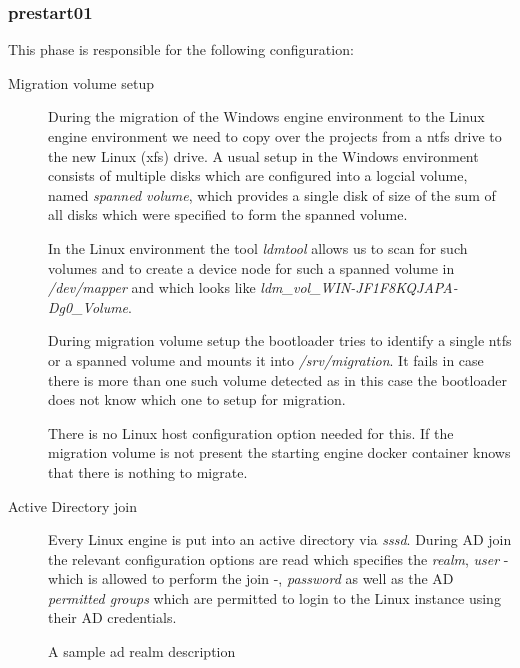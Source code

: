 			\subsubsection{prestart01}
			This phase is responsible for the following configuration:
			\begin{description}
				\item[Migration volume setup] During the migration of the Windows engine environment to the Linux engine environment we need to copy over the projects from a ntfs drive to the new Linux (xfs) drive. A usual setup in the Windows environment consists of multiple disks which are configured into a logcial volume, named \emph{spanned volume}, which provides a single disk of size of the sum of all disks which were specified to form the spanned volume.
			
			In the Linux environment the tool \emph{ldmtool} allows us to scan for such volumes and to create a device node for such a spanned volume in \emph{/dev/mapper} and which looks like \emph{ldm\_vol\_WIN-JF1F8KQJAPA-Dg0\_Volume}.
			
			During migration volume setup the bootloader tries to identify a single ntfs or a spanned volume and mounts it into \emph{/srv/migration}. It fails in case there is more than one such volume detected as in this case the bootloader does not know which one to setup for migration.
			
			There is no Linux host configuration option needed for this. If the migration volume is not present the starting engine docker container knows that there is nothing to migrate.
			
				\item[Active Directory join] Every Linux engine is put into an active directory via \emph{sssd}. During AD join the relevant configuration options are read which specifies the \emph{realm}, \emph{user} - which is allowed to perform the join -, \emph{password} as well as the AD \emph{permitted groups} which are permitted to login to the Linux instance using their AD credentials.
				\begin{listing}[H]
					\caption{A sample ad realm description}
					\label{lst:p01:ch01:linhost_ad_realm_descr}
					\inputminted{yaml}{\relative{chapter_01/section_3.2/ad_realm_description_example.yaml}}
				\end{listing}

			\end{description}
			
